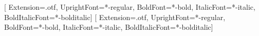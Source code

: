%
%

\usepackage{graphicx}
\usepackage{amsmath,amssymb}
\usepackage{booktabs}
\usepackage{array}
\usepackage{multirow}
\usepackage{enumitem}   %
\usepackage{tikz}       %
\usetikzlibrary{arrows.meta,positioning,backgrounds,fit,shapes.geometric,calc}
\usepackage{pgfplots}   %
\pgfplotsset{compat=1.18}

\usepackage{iftex}
\ifXeTeX
  \usepackage{fontspec}
  \setmainfont{texgyretermes}[
    Extension=.otf, UprightFont=*-regular, BoldFont=*-bold,
    ItalicFont=*-italic, BoldItalicFont=*-bolditalic]
  \setsansfont{texgyreheros}[
    Extension=.otf, UprightFont=*-regular, BoldFont=*-bold,
    ItalicFont=*-italic, BoldItalicFont=*-bolditalic]
\fi


